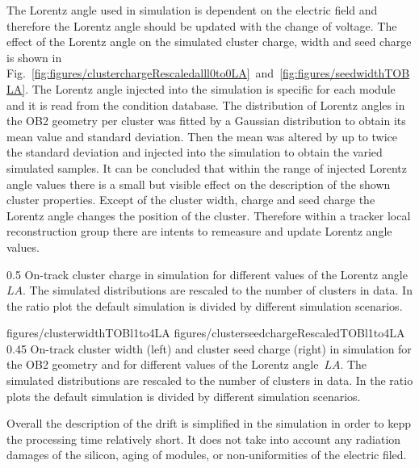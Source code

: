 The Lorentz angle used in simulation is dependent on the electric field and therefore the Lorentz angle should be updated with the change of voltage. The effect of the Lorentz angle on the simulated cluster charge, width and seed charge is shown in Fig.~\ref{fig:figures/clusterchargeRescaledalll0to0LA}~and~\ref{fig:figures/seedwidthTOBLA}. The Lorentz angle injected into the simulation is specific for each module and it is read from the condition database. The distribution of Lorentz angles in the OB2 geometry per cluster was fitted by  a Gaussian distribution to obtain its mean value and standard deviation. Then the mean was altered by up to twice the standard deviation and injected into the simulation to obtain the varied simulated samples. It can be concluded that within the range of injected Lorentz angle values there is a small but visible effect on the description of the shown cluster properties. Except of the cluster width, charge and seed charge the Lorentz angle changes the position of the cluster. Therefore within a tracker local reconstruction group there are intents to remeasure and update Lorentz angle values.


                 {0.5}       %
                 { On-track cluster charge in simulation for different values of the Lorentz angle~$LA$.  The simulated distributions are rescaled to the number of clusters in data. In the ratio plot the default simulation is divided by different simulation scenarios. }

                 {figures/clusterwidthTOBl1to4LA}
                 {figures/clusterseedchargeRescaledTOBl1to4LA} %
                 {0.45}       %
                 { On-track cluster width (left) and cluster seed charge (right) in simulation for the OB2 geometry and for different values of the Lorentz angle~$LA$.  The simulated distributions are rescaled to the number of clusters in data. In the ratio plots the default simulation is divided by different simulation scenarios. }

Overall the description of the drift is simplified in the simulation in order to kepp the processing time relatively short. It does not take into account any radiation damages of the silicon, aging of modules, or non-uniformities of the electric filed.

